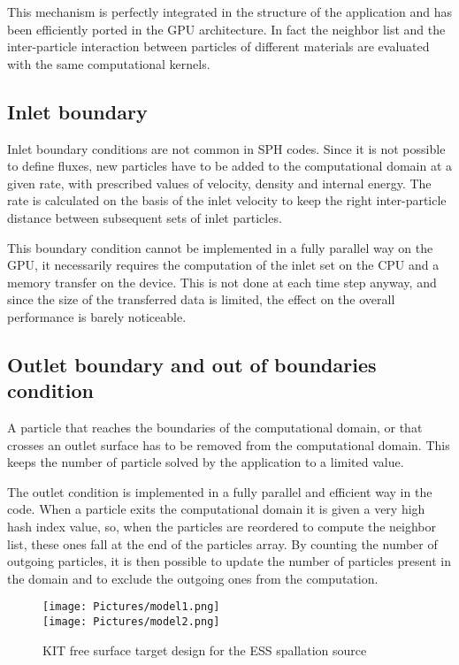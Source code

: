 \documentclass[a4paper, 11pt, twocolumn]{article}
\begin{document}
This mechanism is perfectly integrated in the structure of the application and has been efficiently ported in the GPU architecture. In fact the neighbor list and the inter-particle interaction between particles of different materials are evaluated with the same computational kernels.

\subsection{Inlet boundary}
Inlet boundary conditions are not common in SPH codes. Since it is not possible to define fluxes, new particles have to be added to the computational domain at a given rate, with prescribed values of velocity, density and internal energy. The rate is calculated on the basis of the inlet velocity to keep the right inter-particle distance between subsequent sets of inlet particles.

This boundary condition cannot be implemented in a fully parallel way on the GPU, it necessarily requires the computation of the inlet set on the CPU and a memory transfer on the device. This is not done at each time step anyway, and since the size of the transferred data is limited, the effect on the overall performance is barely noticeable.

\subsection{Outlet boundary and out of boundaries condition}
A particle that reaches the boundaries of the computational domain, or that crosses an outlet surface has to be removed from the computational domain. This keeps the number of particle solved by the application to a limited value. 

The outlet condition is implemented in a fully parallel and efficient way in the code. 
When a particle exits the computational domain it is given a very high hash index value, so, when the particles are reordered to compute the neighbor list, these ones fall at the end of the particles array. By counting the number of outgoing particles, it is then possible to update the number of particles present in the domain and to exclude the outgoing ones from the computation.

\begin{figure*}[!t]
\centering
\texttt{[image: Pictures/model1.png]} \\
\texttt{[image: Pictures/model2.png]} 
\caption{KIT free surface target design for the ESS spallation source} 
\label{fig:target}
\end{figure*}
\end{document}
